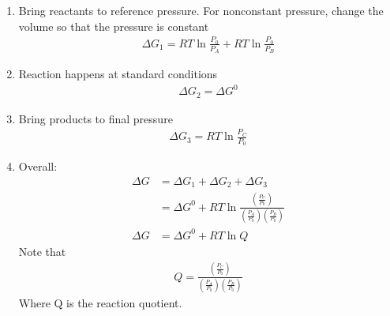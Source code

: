 \documentclass{article}  %
\begin{document}
\begin{enumerate}
    \item Bring reactants to reference pressure. For nonconstant pressure, change the volume so that the pressure is constant
        \begin{equation*}
            \begin{aligned}
                \Delta G_1 = RT \ln \frac{P_0}{P_A} + RT \ln \frac{P_0}{P_B}
            \end{aligned}
        \end{equation*}
    \item Reaction happens at standard conditions
        \begin{equation*}
            \begin{aligned}
                \Delta G_2 = \Delta G^0
            \end{aligned}
        \end{equation*}
    \item Bring products to final pressure
        \begin{equation*}
            \begin{aligned}
                \Delta G_3 = RT \ln \frac{P_C}{P_0}
            \end{aligned}
        \end{equation*}
    \item Overall:
        \begin{equation*}
            \begin{aligned}
                \Delta G &= \Delta G_1 + \Delta G_2 + \Delta G_3 \\
                &= \Delta G^0 + RT \ln \frac{\left(\frac{P_C}{P_0}\right)}{\left(\frac{P_A}{P_0}\right)\left(\frac{P_B}{P_0}\right)} \\
                \Delta G &= \Delta G^0 + RT \ln Q
            \end{aligned}
        \end{equation*}
        Note that
        \begin{equation*}
            \begin{aligned}
                Q = \frac{\left(\frac{P_C}{P_0}\right)}{\left(\frac{P_A}{P_0}\right)\left(\frac{P_B}{P_0}\right)}
            \end{aligned}
        \end{equation*}
        Where Q is the reaction quotient.
\end{enumerate}
\end{document}
